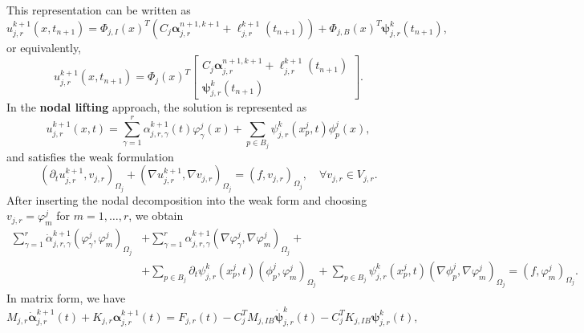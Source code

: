 \documentclass[a4paper, 11pt]{article}
\theoremstyle{remark}
\begin{document}
This representation can be written as
\begin{equation*}
    u^{k+1}_{j, r}(x, t_{n+1}) = \Phi_{j, I}(x)^{T}\left(C_{j}\boldsymbol{\alpha}_{j, r}^{n+1, k+1} + \boldsymbol{\ell}_{j, r}^{k+1}(t_{n+1})\right) + \Phi_{j, B}(x)^{T}\boldsymbol{\psi}_{j, r}^{k}(t_{n+1}),
\end{equation*}
or equivalently,
\begin{equation*}
    u^{k+1}_{j, r}(x, t_{n+1}) = \Phi_{j}(x)^{T}
    \begin{bmatrix}
        C_{j}\boldsymbol{\alpha}_{j, r}^{n+1, k+1} + \boldsymbol{\ell}_{j, r}^{k+1}(t_{n+1})\\
        \boldsymbol{\psi}_{j, r}^{k}(t_{n+1})
    \end{bmatrix}.
\end{equation*}
In the \textbf{nodal lifting} approach, the solution is represented as
\begin{equation*}
    u_{j, r}^{k+1}(x, t) = \sum_{\gamma=1}^{r} \alpha_{j, r, \gamma}^{k+1}(t)\varphi^{j}_{\gamma}(x) + \sum_{p\in B_{j}}\psi_{j, r}^{k}(x^{j}_{p}, t)\phi^{j}_{p}(x),
\end{equation*}
and satisfies the weak formulation
\begin{equation*}
    \left(\partial_{t} u_{j, r}^{k+1}, v_{j, r}\right)_{\Omega_{j}} + \left(\nabla u_{j, r}^{k+1}, \nabla v_{j, r}\right)_{\Omega_{j}} = \left(f, v_{j, r}\right)_{\Omega_{j}}, \quad\forall v_{j, r}\in V_{j,r}.    
\end{equation*}
After inserting the nodal decomposition into the weak form and choosing $v_{j, r} = \varphi^{j}_{m}$ for $m = 1, \ldots, r$, we obtain
\begin{align*}
    \sum_{\gamma = 1}^{r} \dot{\alpha}_{j, r, \gamma}^{k+1}\left(\varphi^{j}_{\gamma}, \varphi^{j}_{m}\right)_{\Omega_{j}} & + \sum_{\gamma = 1}^{r} \alpha_{j, r, \gamma}^{k+1}\left(\nabla\varphi^{j}_{\gamma}, \nabla\varphi^{j}_{m}\right)_{\Omega_{j}} + \\
    & + \sum_{p\in B_{j}}\partial_{t}\psi_{j, r}^{k}(x^{j}_{p}, t)\left(\phi^{j}_{p}, \varphi^{j}_{m}\right)_{\Omega_{j}} + \sum_{p\in B_{j}}\psi_{j, r}^{k}(x^{j}_{p}, t)\left(\nabla\phi^{j}_{p}, \nabla\varphi^{j}_{m}\right)_{\Omega_{j}} = \left(f, \varphi^{j}_{m}\right)_{\Omega_{j}}.
\end{align*}
In matrix form, we have
\begin{equation*}
    M_{j, r}\boldsymbol{\dot{\alpha}}_{j, r}^{k+1}(t) + K_{j, r}\boldsymbol{\alpha}_{j, r}^{k+1}(t) = F_{j, r}(t) - C_{j}^{T}M_{j, IB}\boldsymbol{\dot{\psi}}_{j, r}^{k}(t) - C_{j}^{T}K_{j, IB}\boldsymbol{\psi}_{j, r}^{k}(t),
\end{equation*}
\end{document}
